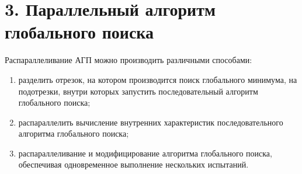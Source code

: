 \documentclass{report}
\begin{document}
\newpage

\section*{3. Параллельный алгоритм глобального поиска}
Распараллеливание АГП можно производить различными способами:
\begin{enumerate}
  \item разделить отрезок, на котором производится поиск глобального минимума, на подотрезки, внутри которых запустить последовательный алгоритм глобального поиска;
  \item распараллелить вычисление внутренних характеристик последовательного алгоритма глобального поиска;
  \item распараллеливание и модифицирование алгоритма глобального поиска, обеспечивая одновременное выполнение нескольких испытаний.
\end{enumerate}
\end{document}
